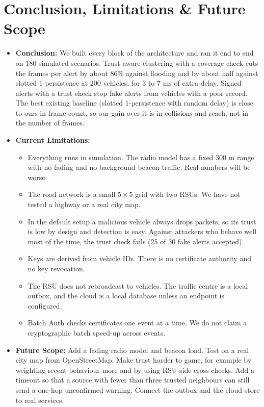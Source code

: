 \documentclass[11pt, a4paper]{article}
\begin{document}
\section{Conclusion, Limitations \& Future Scope}
\begin{itemize}[noitemsep, topsep=2pt]
    \item \textbf{Conclusion:} We built every block of the architecture and ran it end to end on 180 simulated scenarios. Trust-aware clustering with a coverage check cuts the frames per alert by about 86\% against flooding and by about half against slotted 1-persistence at 200 vehicles, for 3 to 7 ms of extra delay. Signed alerts with a trust check stop fake alerts from vehicles with a poor record. The best existing baseline (slotted 1-persistence with random delay) is close to ours in frame count, so our gain over it is in collisions and reach, not in the number of frames.
    \item \textbf{Current Limitations:}
    \begin{itemize}[noitemsep, topsep=1pt]
        \item Everything runs in simulation. The radio model has a fixed 300 m range with no fading and no background beacon traffic. Real numbers will be worse.
        \item The road network is a small $5\times5$ grid with two RSUs. We have not tested a highway or a real city map.
        \item In the default setup a malicious vehicle always drops packets, so its trust is low by design and detection is easy. Against attackers who behave well most of the time, the trust check fails (25 of 30 fake alerts accepted).
        \item Keys are derived from vehicle IDs. There is no certificate authority and no key revocation.
        \item The RSU does not rebroadcast to vehicles. The traffic centre is a local outbox, and the cloud is a local database unless an endpoint is configured.
        \item Batch Auth checks certificates one event at a time. We do not claim a cryptographic batch speed-up across events.
    \end{itemize}
    \item \textbf{Future Scope:} Add a fading radio model and beacon load. Test on a real city map from OpenStreetMap. Make trust harder to game, for example by weighting recent behaviour more and by using RSU-side cross-checks. Add a timeout so that a source with fewer than three trusted neighbours can still send a one-hop unconfirmed warning. Connect the outbox and the cloud store to real services.
\end{itemize}
\end{document}
